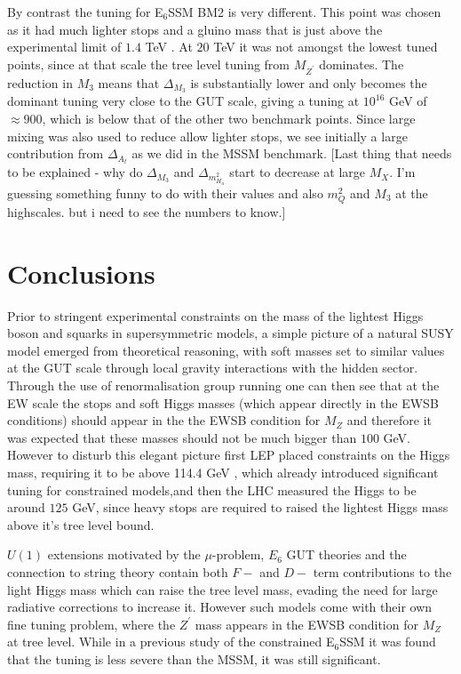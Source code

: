\documentclass[preprint,amsmath,amssymb,aps,superscriptaddress,prd,showpacs,floatfix,nofootinbib]{revtex4-1}
\begin{document}
By contrast the tuning for E$_6$SSM BM2 is very different.  This point
was chosen as it had much lighter stops and a gluino mass that is just
above the experimental limit of $1.4$ TeV \cite{}.  At $20$ TeV it was
not amongst the lowest tuned points, since at that scale the tree
level tuning from $M_{Z^\prime}$ dominates.  The reduction in $M_3$
means that $\Delta_{M_3}$ is substantially lower and only becomes the
dominant tuning very close to the GUT scale, giving a tuning at
$10^{16}$ GeV of $\approx 900$, which is below that of the other two
benchmark points.  Since large mixing was also used to reduce allow
lighter stops, we see initially a large contribution from
$\Delta_{A_t}$ as we did in the MSSM benchmark.  [Last thing that needs to be explained - why do $\Delta_{M_3}$ and $\Delta_{m_{H_u}^2}$ start to decrease at large $M_X$.  I'm guessing something funny to do with their values and also  $m_{Q}^2$ and $M_3$ at the highscales.  but i need to see the numbers to know.]




\section{\label{sec:conclusion}Conclusions}

Prior to stringent experimental constraints on the mass of the
lightest Higgs boson and squarks in supersymmetric models, a simple
picture of a natural SUSY model emerged from theoretical reasoning,
with soft masses set to similar values at the GUT scale through local
gravity interactions with the hidden sector.  Through the use of
renormalisation group running one can then see that at the EW scale
the stops and soft Higgs masses (which appear directly in the EWSB
conditions) should appear in the the EWSB condition for $M_Z$ and
therefore it was expected that these masses should not be much bigger
than $100$ GeV.  However to disturb this elegant picture first LEP
placed constraints on the Higgs mass, requiring it to be above 114.4
GeV \cite{}, which already introduced significant tuning for
constrained models,and then the LHC measured the Higgs to be around
$125$ GeV, since heavy stops are required to raised the lightest
Higgs mass above it's tree level bound.

$U(1)$ extensions motivated by the $\mu$-problem, $E_6$ GUT theories
and the connection to string theory contain both $F-$ and $D-$ term
contributions to the light Higgs mass which can raise the tree level
mass, evading the need for large radiative corrections to increase it.
However such models come with their own fine tuning problem, where the
$Z^\prime$ mass appears in the EWSB condition for $M_Z$ at tree level.
While in a previous study of the constrained E$_6$SSM it was found
that the tuning is less severe than the MSSM, it was still significant.
\end{document}
